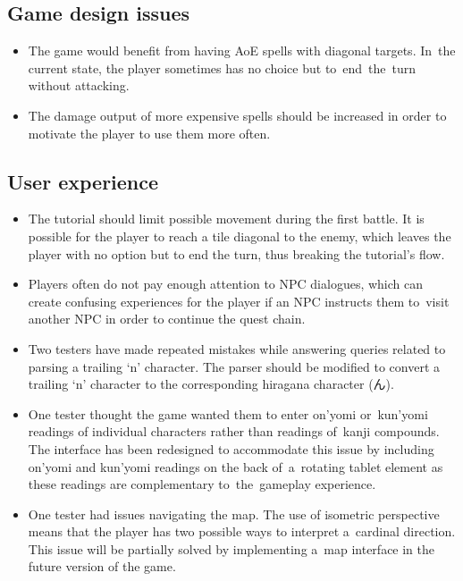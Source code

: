 \documentclass[thesis=B,english,hidelinks]{FITthesisXE}[2012/06/26]
\begin{document}
\subsection{Game design issues}

\begin{itemize}
\item The game would benefit from having AoE spells with diagonal targets. In~the current state, the player sometimes has no choice but to~end~the~turn without attacking.
\item The damage output of more expensive spells should be increased in order to motivate the player to use them more often.
\end{itemize}

\newpage

\subsection{User experience}

\begin{itemize}
\item The tutorial should limit possible movement during the first battle. It is possible for the player to reach a tile diagonal to the enemy, which leaves the player with no option but to end the turn, thus breaking the tutorial's flow.
\item Players often do not pay enough attention to NPC dialogues, which can create confusing experiences for the player if an NPC instructs them to~visit another NPC in order to continue the quest chain.
\item Two testers have made repeated mistakes while answering queries related to parsing a trailing `n' character. The parser should be modified to convert a trailing `n' character to the corresponding hiragana character (ん).
\item One tester thought the game wanted them to enter on'yomi or~kun'yomi readings of individual characters rather than readings of~kanji compounds. The interface has been redesigned to accommodate this issue by including on'yomi and kun'yomi readings on the back of~a~rotating tablet element as these readings are complementary to~the~gameplay experience.
\item One tester had issues navigating the map. The use of isometric perspective means that the player has two possible ways to interpret a~cardinal direction. This issue will be partially solved by implementing a~map interface in the future version of the game.
\end{itemize}
\end{document}
